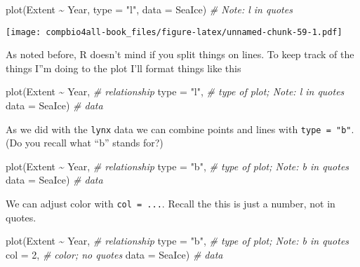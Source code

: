 \documentclass[
]{book}
\newenvironment{Shaded}{\begin{snugshade}}{\end{snugshade}}
\newcommand{\AttributeTok}[1]{\textcolor[rgb]{0.77,0.63,0.00}{#1}}
\newcommand{\CommentTok}[1]{\textcolor[rgb]{0.56,0.35,0.01}{\textit{#1}}}
\newcommand{\DecValTok}[1]{\textcolor[rgb]{0.00,0.00,0.81}{#1}}
\newcommand{\FunctionTok}[1]{\textcolor[rgb]{0.00,0.00,0.00}{#1}}
\newcommand{\NormalTok}[1]{#1}
\newcommand{\SpecialCharTok}[1]{\textcolor[rgb]{0.00,0.00,0.00}{#1}}
\newcommand{\StringTok}[1]{\textcolor[rgb]{0.31,0.60,0.02}{#1}}
\begin{document}
\begin{Shaded}
\begin{Highlighting}[]
\FunctionTok{plot}\NormalTok{(Extent }\SpecialCharTok{\textasciitilde{}}\NormalTok{ Year, }\AttributeTok{type =} \StringTok{"l"}\NormalTok{, }\AttributeTok{data =}\NormalTok{ SeaIce)  }\CommentTok{\# Note: l in quotes}
\end{Highlighting}
\end{Shaded}

\texttt{[image: compbio4all-book\_files/figure-latex/unnamed-chunk-59-1.pdf]}

As noted before, R doesn't mind if you split things on lines. To keep track of the things I''m doing to the plot I'll format things like this

\begin{Shaded}
\begin{Highlighting}[]
\FunctionTok{plot}\NormalTok{(Extent }\SpecialCharTok{\textasciitilde{}}\NormalTok{ Year,  }\CommentTok{\# relationship}
     \AttributeTok{type =} \StringTok{"l"}\NormalTok{,     }\CommentTok{\# type of plot; Note: l in quotes}
     \AttributeTok{data =}\NormalTok{ SeaIce)  }\CommentTok{\# data}
\end{Highlighting}
\end{Shaded}

As we did with the \texttt{lynx} data we can combine points and lines with \texttt{type\ =\ "b"}. (Do you recall what ``b'' stands for?)

\begin{Shaded}
\begin{Highlighting}[]
\FunctionTok{plot}\NormalTok{(Extent }\SpecialCharTok{\textasciitilde{}}\NormalTok{ Year,  }\CommentTok{\# relationship}
     \AttributeTok{type =} \StringTok{"b"}\NormalTok{,     }\CommentTok{\# type of plot; Note: b in quotes}
     \AttributeTok{data =}\NormalTok{ SeaIce)  }\CommentTok{\# data}
\end{Highlighting}
\end{Shaded}

We can adjust color with \texttt{col\ =\ ...}. Recall the this is just a number, not in quotes.

\begin{Shaded}
\begin{Highlighting}[]
\FunctionTok{plot}\NormalTok{(Extent }\SpecialCharTok{\textasciitilde{}}\NormalTok{ Year,  }\CommentTok{\# relationship}
     \AttributeTok{type =} \StringTok{"b"}\NormalTok{,     }\CommentTok{\# type of plot; Note: b in quotes}
     \AttributeTok{col =} \DecValTok{2}\NormalTok{,        }\CommentTok{\# color; no quotes}
     \AttributeTok{data =}\NormalTok{ SeaIce)  }\CommentTok{\# data}
\end{Highlighting}
\end{Shaded}
\end{document}
